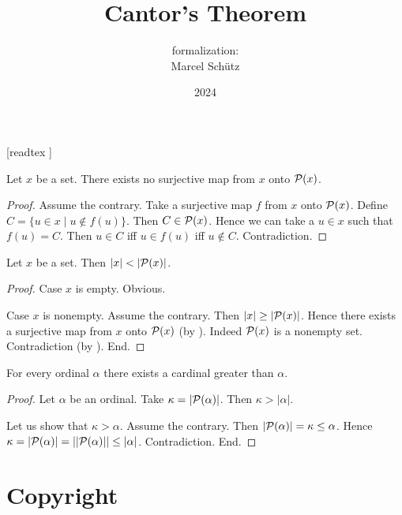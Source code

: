 \documentclass{article}
\title{Cantor's Theorem}
\author{\Naproche formalization: \vspace{0.5em} \\
Marcel Schütz}
\date{2024}
\begin{document}
  \maketitle

  \begin{imports}
    \begin{forthel}
      [readtex ]
    \end{forthel}
  \end{imports}

  \begin{forthel}
    \begin{theorem*}\label{cantor}
      Let $x$ be a set.
      There exists no surjective map from $x$ onto $\mathcal{P}(x)$.
    \end{theorem*}
    \begin{proof}
      Assume the contrary.
      Take a surjective map $f$ from $x$ onto $\mathcal{P}(x)$.
      Define $C = \{ u \in x \mid u \notin f(u) \}$.
      Then $C \in \mathcal{P}(x)$.
      Hence we can take a $u \in x$ such that $f(u) = C$.
      Then $u \in C$ iff $u \in f(u)$ iff $u \notin C$.
      Contradiction.
    \end{proof}
  \end{forthel}
  
  \begin{forthel}
    \begin{corollary*}
      Let $x$ be a set.
      Then $|x| < |\mathcal{P}(x)|$.
    \end{corollary*}
    \begin{proof}
      Case $x$ is empty. Obvious.

      Case $x$ is nonempty.
        Assume the contrary.
        Then $|x| \geq |\mathcal{P}(x)|$.
        Hence there exists a surjective map from $x$ onto $\mathcal{P}(x)$ (by ).
        Indeed $\mathcal{P}(x)$ is a nonempty set.
        Contradiction (by ).
      End.
    \end{proof}
  \end{forthel}

  \begin{forthel}
    \begin{corollary*}
      For every ordinal $\alpha$ there exists a cardinal greater than $\alpha$.
    \end{corollary*}
    \begin{proof}
      Let $\alpha$ be an ordinal.
      Take $\kappa = |\mathcal{P}(\alpha)|$.
      Then $\kappa > |\alpha|$.

      Let us show that $\kappa > \alpha$.
        Assume the contrary.
        Then $|\mathcal{P}(\alpha)|
          = \kappa
          \leq \alpha$.
        Hence $\kappa
          = |\mathcal{P}(\alpha)|
          = ||\mathcal{P}(\alpha)||
          \leq |\alpha|$.
        Contradiction.
      End.
    \end{proof}
  \end{forthel}

  \section*{Copyright}
  \doclicenseThis
\end{document}

